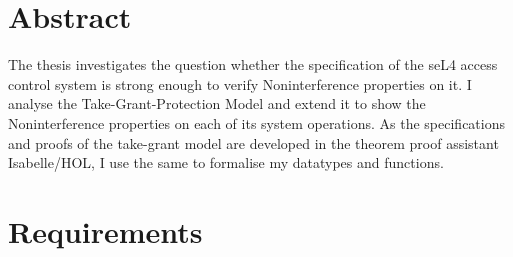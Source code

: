 \documentclass[11pt,a4paper, twoside, open=right]{scrreprt}
\begin{document}
	
\deckblatt
	
	
\declaration

\cleardoublepage 
{}
\chapter*{Abstract}
	
The thesis investigates the question whether the specification of the seL4 access control system is strong enough to verify Noninterference properties on it. I analyse the Take-Grant-Protection Model \cite{TakeG} and extend it to show the Noninterference properties \cite{InfFlow} on each of its system operations. 
As the specifications and proofs of the take-grant model are developed in the theorem proof assistant Isabelle/HOL, I use the same to formalise my datatypes and functions. 
	

\listoffigures
\newpage
\tableofcontents

	
\cleardoublepage

	 
\newpage
\chapter{Requirements}



\newpage
 



\end{document}
